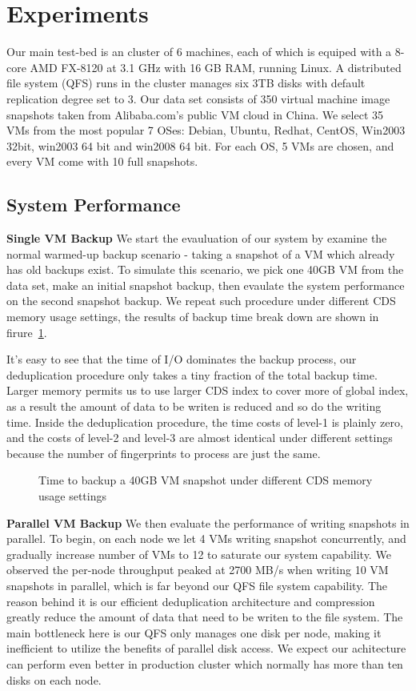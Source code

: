 \section{Experiments}
Our main test-bed is an cluster of 6 machines,
each of which is equiped with a 8-core AMD FX-8120 at 3.1 GHz
with 16 GB RAM, running Linux.
A distributed file system (QFS) runs in the cluster manages six 3TB disks
 with default replication degree set to 3.
Our data set consists of 350 virtual machine image snapshots taken from Alibaba.com's
public VM cloud in China. We select 35 VMs from the most popular 7 OSes: 
Debian, Ubuntu, Redhat, CentOS, Win2003 32bit, win2003 64 bit and win2008 64 bit. 
For each OS, 5 VMs are chosen, and every VM come with 10 full snapshots.

\subsection{System Performance}
{\bf Single VM Backup} We start the evauluation of our system by examine the normal warmed-up
backup scenario - taking a snapshot of a VM which already has old backups exist. To simulate this
scenario, we pick one 40GB VM from the data set, make an initial snapshot backup, then
evaulate the system performance on the second snapshot backup. We repeat such procedure
under different CDS memory usage settings, the results of backup time break down are shown in
firure~\ref{fig:single_vm_backup}. 

It's easy to see that the time of I/O dominates the backup process, our deduplication
procedure only takes a tiny fraction of the total backup time. Larger memory permits us to
use larger CDS index to cover more of global index, as a result the amount of data to be writen
is reduced and so do the writing time.
Inside the deduplication procedure, the time costs of level-1
is plainly zero, and the costs of level-2 and level-3 are almost identical under different settings
because the number of fingerprints to process are just the same.
\begin{figure}[htbp]
  \centering
  \caption{Time to backup a 40GB VM snapshot under different CDS memory usage settings}
  \label{fig:single_vm_backup}
\end{figure}

{\bf Parallel VM Backup} We then evaluate the performance of writing snapshots in parallel.
To begin, on each node we let 4 VMs writing snapshot concurrently, and gradually 
increase number of VMs to 12 to saturate our system capability. We observed 
the per-node throughput peaked at 2700 MB/s when writing 10 VM snapshots in parallel, 
which is far beyond our QFS file system capability. The reason behind it is our efficient
deduplication architecture and compression greatly reduce the amount of data that need to be writen to
the file system. The main bottleneck here is our QFS only manages one disk per node, 
making it inefficient to utilize the benefits of parallel disk access. We expect our achitecture can
perform even better in production cluster which normally has more than ten disks on each node.

